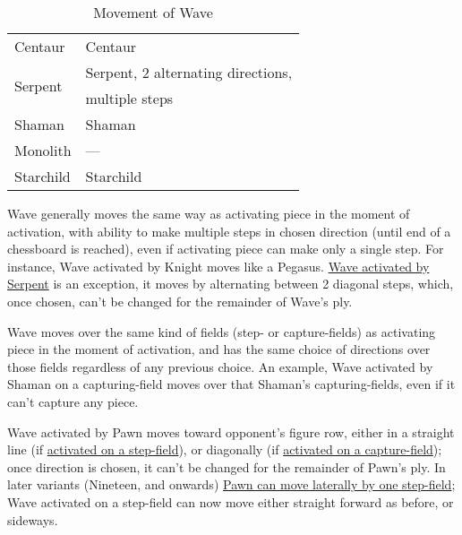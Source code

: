 \begin{table}[!h]
\begin{tabular}{ ll }
Centaur                     & Centaur                                   \\
\cmidrule{1-2} %
\multirow{2}{*}{Serpent}    & Serpent, 2 alternating directions,        \\
                            & multiple steps                            \\
\cmidrule{1-2} %
Shaman                      & Shaman                                    \\
Monolith                    & ---                                       \\
Starchild                   & Starchild                                 \\
\bottomrule %
\end{tabular}
\caption{Movement of Wave}
\label{tbl:Appendix/Movement of Wave}
\end{table}

Wave generally moves the same way as activating piece in the moment of activation,
with ability to make multiple steps in chosen direction (until end of a chessboard
is reached), even if activating piece can make only a single step. For instance,
Wave activated by Knight moves like a Pegasus.
\hyperref[fig:scn_tr_29_serpent_activating_wave]{Wave activated by Serpent} is an
exception, it moves by alternating between 2 diagonal steps, which, once chosen,
can't be changed for the remainder of Wave's ply.

Wave moves over the same kind of fields (step- or capture-fields) as activating
piece in the moment of activation, and has the same choice of directions over those
fields regardless of any previous choice. An example, Wave activated by Shaman on a
capturing-field moves over that Shaman's capturing-fields, even if it can't capture
any piece.

Wave activated by Pawn moves toward opponent's figure row, either in a straight line
(if \hyperref[fig:scn_mv_16_wave_activation_by_step_pawn]{activated on a step-field}),
or diagonally (if
\hyperref[fig:scn_mv_18_wave_activation_by_capture_pawn]{activated on a capture-field});
once direction is chosen, it can't be changed for the remainder of Pawn's ply.
In later variants (Nineteen, and onwards)
\hyperref[fig:scn_n_15_sideways_pawn_init]{Pawn can move laterally by one step-field};
Wave activated on a step-field can now move either straight forward as before, or
sideways.

